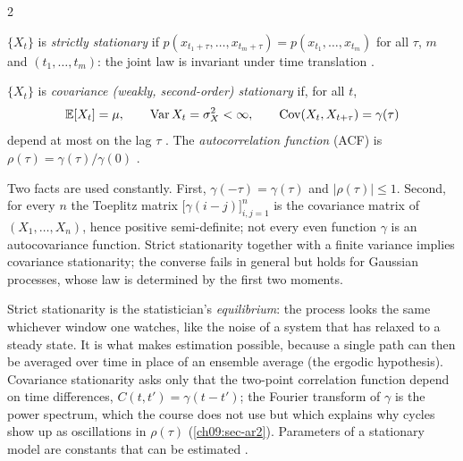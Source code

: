 \begin{paracol}{2}
\begin{definition}\label{ch09:def-strict}
$\{X_t\}$ is \emph{strictly stationary} if $p(x_{t_1+\tau},\dots,x_{t_m+\tau})=p(x_{t_1},\dots,x_{t_m})$ for all
$\tau$, $m$ and $(t_1,\dots,t_m)$: the joint law is invariant under time translation .
\end{definition}

\begin{definition}\label{ch09:def-cov}
$\{X_t\}$ is \emph{covariance (weakly, second-order) stationary} if, for all $t$,
\[
  \mathbb{E}[X_t]=\mu,\qquad \operatorname{Var} X_t=\sigma_X^2<\infty,\qquad \operatorname{Cov}(X_t,X_{t+\tau})=\gamma(\tau)
\]
depend at most on the lag $\tau$ . The \emph{autocorrelation function}
(ACF) is $\rho(\tau)=\gamma(\tau)/\gamma(0)$ .
\end{definition}

Two facts are used constantly. First, $\gamma(-\tau)=\gamma(\tau)$ and $|\rho(\tau)|\le1$. Second, for
every $n$ the Toeplitz matrix $\bigl[\gamma(i-j)\bigr]_{i,j=1}^n$ is the covariance matrix of $(X_1,\dots,X_n)$, hence
positive semi-definite; not every even function $\gamma$ is an autocovariance function.
Strict stationarity together with a finite variance implies covariance stationarity; the converse fails
in general but holds for Gaussian processes, whose law is determined by the first two moments.

\begin{intuition}
Strict stationarity is the statistician's \emph{equilibrium}: the process looks the same whichever window
one watches, like the noise of a system that has relaxed to a steady state. It is what makes estimation
possible, because a single path can then be averaged over time in place of an ensemble average (the
ergodic hypothesis). Covariance stationarity asks only that the two-point correlation function depend on
time differences, $C(t,t')=\gamma(t-t')$; the Fourier transform of $\gamma$ is the power spectrum, which the
course does not use but which explains why cycles show up as oscillations in $\rho(\tau)$
(\cref{ch09:sec-ar2}). Parameters of a stationary model are constants that can be estimated
.
\end{intuition}


\end{paracol}
